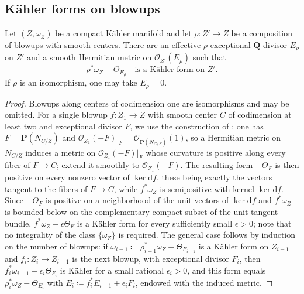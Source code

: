 \subsection{K\"ahler forms on blowups}

\begin{lemma}\label{nk:lem:exceptional-metric}
Let $(Z,\omega_Z)$ be a compact K\"ahler manifold and let
$\rho\colon Z'\to Z$ be a composition of blowups with smooth centers.
There are an effective $\rho$-exceptional $\mathbf Q$-divisor $E_\rho$
on $Z'$ and a smooth Hermitian metric on $\mathcal O_{Z'}(E_\rho)$ such that
\[
  \rho^*\omega_Z-\Theta_{E_\rho}\quad\text{is a K\"ahler form on }Z'.
\]
If $\rho$ is an isomorphism, one may take $E_\rho=0$.
\end{lemma}

\begin{proof}
Blowups along centers of codimension one are isomorphisms and may be
omitted. For a single blowup $f\colon Z_1\to Z$ with smooth center
$C$ of codimension at least two and exceptional divisor $F$, we use
the construction of
\cite[Chapter~VII, Proposition~12.4 and its proof]{DemCADG}: one has
$F=\mathbf P(N_{C/Z})$ and
$\mathcal O_{Z_1}(-F)|_F=\mathcal O_{\mathbf P(N_{C/Z})}(1)$, so a Hermitian metric on
$N_{C/Z}$ induces a metric on $\mathcal O_{Z_1}(-F)|_F$ whose curvature is
positive along every fiber of $F\to C$; extend it smoothly to
$\mathcal O_{Z_1}(-F)$. The resulting form $-\Theta_F$ is then positive on
every nonzero vector of $\ker \mathrm{d}f$, these being exactly the vectors
tangent to the fibers of $F\to C$, while $f^*\omega_Z$ is
semipositive with kernel $\ker \mathrm{d}f$. Since $-\Theta_F$ is positive on
a neighborhood of the unit vectors of $\ker \mathrm{d}f$ and $f^*\omega_Z$ is
bounded below on the complementary compact subset of the unit tangent
bundle, $f^*\omega_Z-\epsilon\Theta_F$ is a K\"ahler form for every
sufficiently small $\epsilon>0$; note that no integrality of the class
$\{\omega_Z\}$ is required. The general case follows by induction on
the number of blowups: if
$\omega_{i-1}\coloneqq \rho_{i-1}^*\omega_Z-\Theta_{E_{i-1}}$ is a K\"ahler
form on $Z_{i-1}$ and $f_i\colon Z_i\to Z_{i-1}$ is the next blowup,
with exceptional divisor $F_i$, then
$f_i^*\omega_{i-1}-\epsilon_i\Theta_{F_i}$ is K\"ahler for a small
rational $\epsilon_i>0$, and this form equals
$\rho_i^*\omega_Z-\Theta_{E_i}$ with
$E_i\coloneqq f_i^*E_{i-1}+\epsilon_iF_i$, endowed with the induced metric.
\end{proof}

